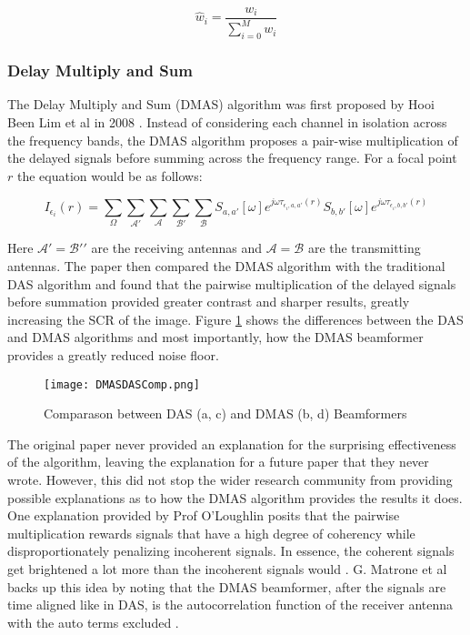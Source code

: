 \begingroup
\large
\begin{equation}
    \hat{w}_i = \frac{w_i}{\sum_{i=0}^{M} w_i}
\end{equation} 
\endgroup

\subsubsection{Delay Multiply and Sum}
The Delay Multiply and Sum (DMAS) algorithm was first proposed by Hooi Been Lim et al in 2008
\cite{beenlimConfocalMicrowaveImaging2008}. Instead of considering each channel in isolation across the frequency bands,
the DMAS algorithm proposes a pair-wise multiplication of the delayed signals before summing across the frequency range.
For a focal point $r$ the equation would be as follows:

\begingroup
\large
\begin{equation}
    I_{\epsilon_i}(r) = \sum_{\Omega}\sum_{\mathcal{A}'}\sum_{\mathcal{A}}\sum_{\mathcal{B}'}\sum_{\mathcal{B}} S_{a, a'}[\omega]e^{j\omega \tau_{\epsilon_i, a, a'}(r)} S_{b, b'}[\omega]e^{j\omega \tau_{\epsilon_i, b, b'}(r)}
    \label{eq:DMASBeamformer}
\end{equation}
\endgroup

Here $\mathcal{A}' = \mathcal{B'}'$ are the receiving antennas and $\mathcal{A} = \mathcal{B}$ are the transmitting
antennas. The paper then compared the DMAS algorithm with the traditional DAS algorithm and found that the pairwise
multiplication of the delayed signals before summation provided greater contrast and sharper results, greatly increasing
the SCR of the image. Figure \ref{fig:DMASDASComp} shows the differences between the DAS and DMAS algorithms and most
importantly, how the DMAS beamformer provides a greatly reduced noise floor.

\begin{figure}[!h]
    \texttt{[image: DMASDASComp.png]}
    \centering
    \caption{Comparason between DAS (a, c) and DMAS (b, d) Beamformers}
    \label{fig:DMASDASComp}
\end{figure}

The original paper never provided an explanation for the surprising effectiveness of the algorithm, leaving
the explanation for a future paper that they never wrote. However, this did not stop the wider research community from
providing possible explanations as to how the DMAS algorithm provides the results it does. One explanation provided by
Prof O'Loughlin posits that the pairwise multiplication rewards signals that have a high degree of coherency while
disproportionately penalizing incoherent signals. In essence, the coherent signals get brightened a lot more than the
incoherent signals would \cite{oloughlinComparingRadarBasedBreast2019}. G. Matrone et al backs up this idea by
noting that the DMAS beamformer, after the signals are time aligned like in DAS, is the autocorrelation function of the
receiver antenna with the auto terms excluded \cite{g.matroneDelayMultiplySum2015}.